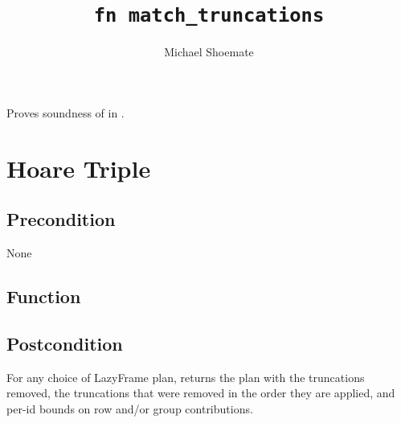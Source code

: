 \documentclass{article}
\title{\texttt{fn match\_truncations}}
\author{Michael Shoemate}
\begin{document}
\maketitle  


\contrib

Proves soundness of  
in .

\section{Hoare Triple}
\subsection*{Precondition}
None 

\subsection*{Function}
\label{sec:python-pseudocode}


\subsection*{Postcondition}
\begin{theorem}[Postcondition]
    For any choice of LazyFrame plan,
    returns the plan with the truncations removed,
    the truncations that were removed in the order they are applied,
    and per-id bounds on row and/or group contributions.
\end{theorem}
\end{document}
